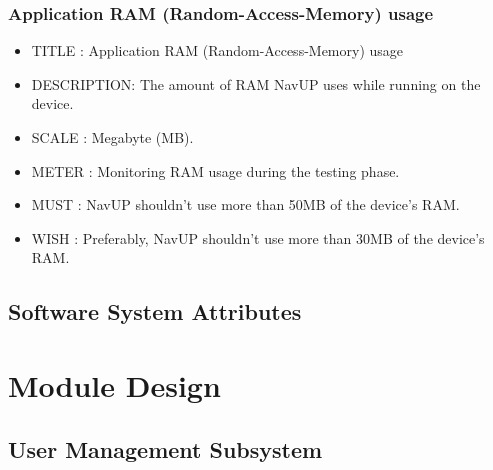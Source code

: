 \documentclass{article}
\begin{document}
		    \subsubsection{Application RAM (Random-Access-Memory) usage}
			\begin{itemize}
		    \item[]TITLE      : Application RAM (Random-Access-Memory) usage
		    \item[]DESCRIPTION: The amount of RAM NavUP uses while running on the device. 
		    \item[]SCALE      : Megabyte (MB).
		    \item[]METER      : Monitoring RAM usage during the testing phase.
		    \item[]MUST       : NavUP shouldn't use more than 50MB of the device's RAM.
		    \item[]WISH       : Preferably, NavUP shouldn't use more than 30MB of the device's RAM.
		    \end{itemize}
			\subsection{Software System Attributes}\label{subsec:attributes}

		\newpage

		\section{Module Design}\label{sec:moduels}	
      \subsection{User Management Subsystem}\label{subsec:users}
      
\end{document}
